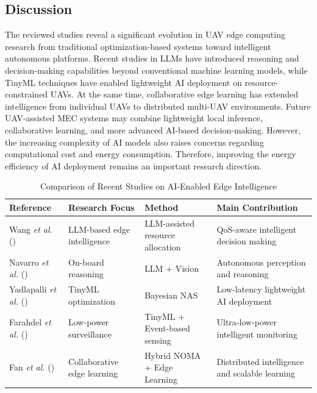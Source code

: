 \documentclass[a4paper, 12pt]{article}
\begin{document}
\subsection*{Discussion}
The reviewed studies reveal a significant evolution in UAV edge computing research from traditional optimization-based systems toward intelligent autonomous platforms. Recent studies in LLMs have introduced reasoning and decision-making capabilities beyond conventional machine learning models, while TinyML techniques have enabled lightweight AI deployment on resource-constrained UAVs. At the same time, collaborative edge learning has extended intelligence from individual UAVs to distributed multi-UAV environments. Future UAV-assisted MEC systems may combine lightweight local inference, collaborative learning, and more advanced AI-based decision-making. However, the increasing complexity of AI models also raises concerns regarding computational cost and energy consumption. Therefore, improving the energy efficiency of AI deployment remains an important research direction.
\begin{table}[H]
\centering
\caption{Comparison of Recent Studies on AI-Enabled Edge Intelligence}
\label{tab:ai_comparison}
\begin{tabular}{|p{2.5cm}|p{3cm}|p{3cm}|p{3cm}|}
\hline
\textbf{Reference} &
\textbf{Research Focus} &
\textbf{Method} &
\textbf{Main Contribution}
\\
\hline

Wang \textit{et al.} (\cite{Wang2026LLM})
&
LLM-based edge intelligence
&
LLM-assisted resource allocation
&
QoS-aware intelligent decision making
\\
\hline

Navarro \textit{et al.} (\cite{Navarro2025})
&
On-board reasoning
&
LLM + Vision
&
Autonomous perception and reasoning
\\
\hline

Yadlapalli \textit{et al.} (\cite{Yadlapalli2026})
&
TinyML optimization
&
Bayesian NAS
&
Low-latency lightweight AI deployment
\\
\hline

Farahdel \textit{et al.} (\cite{Farahdel2025})
&
Low-power surveillance
&
TinyML + Event-based sensing
&
Ultra-low-power intelligent monitoring
\\
\hline

Fan \textit{et al.} (\cite{Fan2025})
&
Collaborative edge learning
&
Hybrid NOMA + Edge Learning
&
Distributed intelligence and scalable learning
\\
\hline

\end{tabular}
\end{table}
\end{document}
